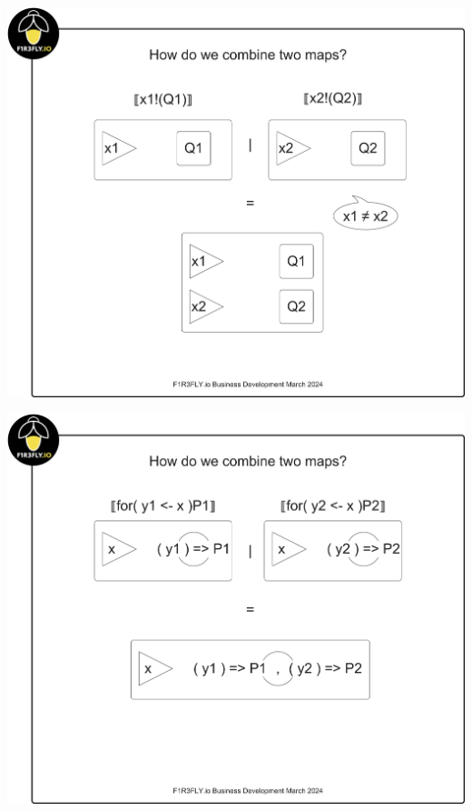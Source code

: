 \includegraphics[scale=0.25]{RHO20RSpaceSlide3.pdf}

\includegraphics[scale=0.25]{RHO20RSpaceSlide4.pdf}

